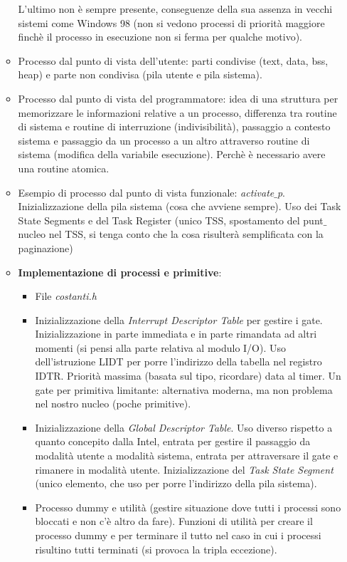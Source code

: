 \begin{itemize}
\begin{itemize}
\begin{itemize}
		\end{itemize}
		L'ultimo non è sempre presente, conseguenze della sua assenza in vecchi sistemi come Windows 98 (non si vedono processi di priorità maggiore finchè il processo in esecuzione non si ferma per qualche motivo).
		\item Processo dal punto di vista dell'utente: parti condivise (text, data, bss, heap) e parte non condivisa (pila utente e pila sistema).
		\item Processo dal punto di vista del programmatore: idea di una struttura per memorizzare le informazioni relative a un processo, differenza tra routine di sistema e routine di interruzione (indivisibilità), passaggio a contesto sistema e passaggio da un processo a un altro attraverso routine di sistema (modifica della variabile esecuzione). Perchè è necessario avere una routine atomica.
		\item Esempio di processo dal punto di vista funzionale: \emph{activate$\_$p}. Inizializzazione della pila sistema (cosa che avviene sempre). Uso dei Task State Segments e del Task Register (unico TSS, spostamento del punt$\_$nucleo nel TSS, si tenga conto che la cosa risulterà semplificata con la paginazione)
		\item \textbf{Implementazione di processi e primitive}:
		\begin{itemize}
			\item File \emph{costanti.h}
			\item Inizializzazione della \emph{Interrupt Descriptor Table} per gestire i gate. Inizializzazione in parte immediata e in parte rimandata ad altri momenti (si pensi alla parte relativa al modulo I/O). Uso dell'istruzione LIDT per porre l'indirizzo della tabella nel registro IDTR. Priorità massima (basata sul tipo, ricordare) data al timer. Un gate per primitiva limitante: alternativa moderna, ma non problema nel nostro nucleo (poche primitive).
			\item Inizializzazione della \emph{Global Descriptor Table}. Uso diverso rispetto a quanto concepito dalla Intel, entrata per gestire il passaggio da modalità utente a modalità sistema, entrata per attraversare il gate e rimanere in modalità utente. Inizializzazione del \emph{Task State Segment} (unico elemento, che uso per porre l'indirizzo della pila sistema).
			\item Processo dummy e utilità (gestire situazione dove tutti i processi sono bloccati e non c'è altro da fare). Funzioni di utilità per creare il processo dummy e per terminare il tutto nel caso in cui i processi risultino tutti terminati (si provoca la tripla eccezione).

\end{itemize}
\end{itemize}
\end{itemize}
